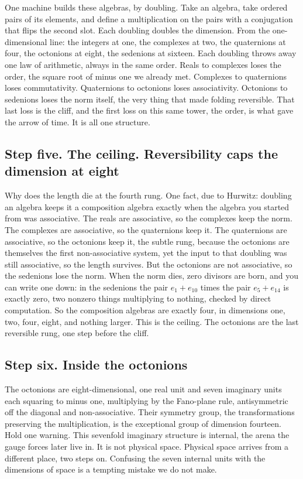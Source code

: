 One machine builds these algebras, by doubling. Take an algebra, take ordered pairs of its elements, and define a multiplication on the pairs with a conjugation that flips the second slot. Each doubling doubles the dimension. From the one-dimensional line: the integers at one, the complexes at two, the quaternions at four, the octonions at eight, the sedenions at sixteen. Each doubling throws away one law of arithmetic, always in the same order. Reals to complexes loses the order, the square root of minus one we already met. Complexes to quaternions loses commutativity. Quaternions to octonions loses associativity. Octonions to sedenions loses the norm itself, the very thing that made folding reversible. That last loss is the cliff, and the first loss on this same tower, the order, is what gave the arrow of time. It is all one structure.

\subsection*{Step five. The ceiling. Reversibility caps the dimension at eight}

Why does the length die at the fourth rung. One fact, due to Hurwitz: doubling an algebra keeps it a composition algebra exactly when the algebra you started from was associative. The reals are associative, so the complexes keep the norm. The complexes are associative, so the quaternions keep it. The quaternions are associative, so the octonions keep it, the subtle rung, because the octonions are themselves the first non-associative system, yet the input to that doubling was still associative, so the length survives. But the octonions are not associative, so the sedenions lose the norm. When the norm dies, zero divisors are born, and you can write one down: in the sedenions the pair $e_1 + e_{10}$ times the pair $e_5 + e_{14}$ is exactly zero, two nonzero things multiplying to nothing, checked by direct computation. So the composition algebras are exactly four, in dimensions one, two, four, eight, and nothing larger. This is the ceiling. The octonions are the last reversible rung, one step before the cliff.

\subsection*{Step six. Inside the octonions}

The octonions are eight-dimensional, one real unit and seven imaginary units each squaring to minus one, multiplying by the Fano-plane rule, antisymmetric off the diagonal and non-associative. Their symmetry group, the transformations preserving the multiplication, is the exceptional group of dimension fourteen. Hold one warning. This sevenfold imaginary structure is internal, the arena the gauge forces later live in. It is not physical space. Physical space arrives from a different place, two steps on. Confusing the seven internal units with the dimensions of space is a tempting mistake we do not make.

